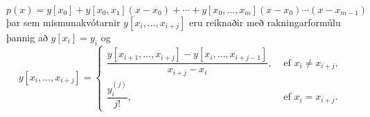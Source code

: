 \documentclass[icelandic,a4paper,12pt]{article}
\begin{document}
$$
p(x)=y[x_0]+y[x_0,x_1](x-x_0)+\cdots+y[x_0,\dots,x_m](x-x_0)\cdots(x-x_{m-1})
$$
þar sem mismunakvótarnir $y[x_i,\ldots,x_{i+j}]$  eru reiknaðir með
rakningarformúlu þannig að $y[x_i]=y_i$ og
$$
  y[x_i,\ldots,x_{i+j}]
  = \begin{cases}\dfrac{y[x_{i+1},\ldots,x_{i+j}] - y[x_i,\ldots,x_{i+j-1}]}
  {x_{i+j} - x_i}, &\text{ ef } x_i\neq x_{i+j},\\
\dfrac{y^{(j)}_i}{j!}, &\text{ ef } x_i=x_{i+j}.
\end{cases}
$$


% 
% 
% 
% 
\end{document}
